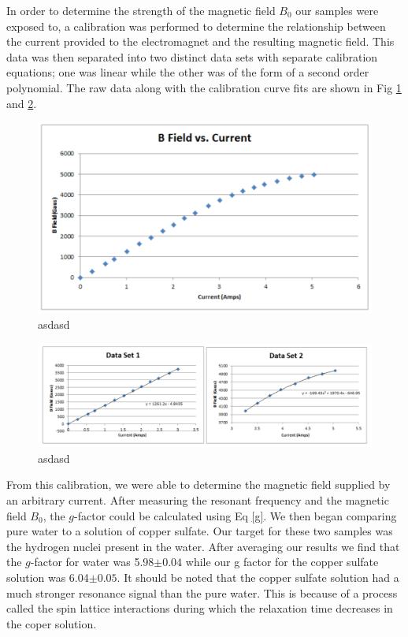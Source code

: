 \documentclass[prb,preprint]{revtex4-1}
\begin{document}
In order to determine the strength of the magnetic field $B_0$ our samples were exposed to, a calibration was performed to determine the relationship between the current provided to the electromagnet and the resulting magnetic field. This data was then separated into two distinct data sets with separate calibration equations; one was linear while the other was of the form of a second order polynomial. The raw data along with the calibration curve fits are shown in Fig \ref{magcal} and \ref{magcal1}.

\begin{figure}[h!]
\centering
\includegraphics[width=.8\textwidth]{magcal.png}
\caption{asdasd}
\label{magcal}
\end{figure}

\begin{figure}[h!]
\centering
\includegraphics[width=.8\textwidth]{magcal1.png}
\caption{asdasd}
\label{magcal1}
\end{figure}

From this calibration, we were able to determine the magnetic field supplied by an arbitrary current. After measuring the resonant frequency and the magnetic field $B_0$, the $g$-factor could be calculated using Eq \ref{g}. We then began comparing pure water to a solution of copper sulfate. Our target for these two samples was the hydrogen nuclei present in the water. After averaging our results we find that the $g$-factor for water was 5.98$\pm0.04$ while our g factor for the copper sulfate solution was 6.04$\pm0.05$. It should be noted that the copper sulfate solution had a much stronger resonance signal than the pure water. This is because of a process called the spin lattice interactions during which the relaxation time decreases in the coper solution.
\end{document}
